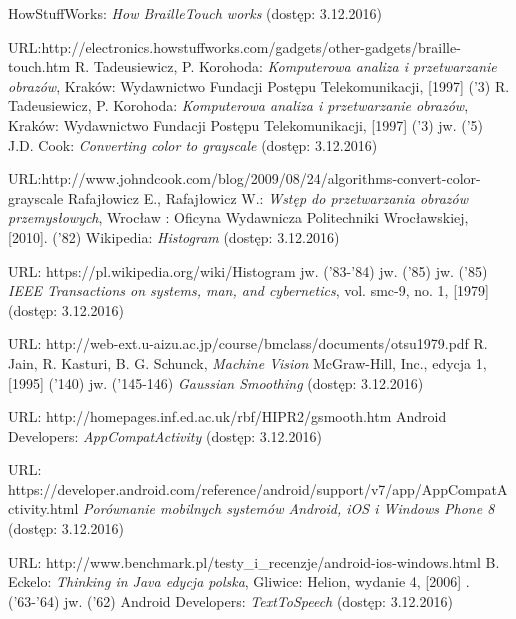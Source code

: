 \documentclass[eng,oneside]{mgr}
\begin{document}
\begin{thebibliography}{99}
 HowStuffWorks: \emph{How BrailleTouch works} (dostęp: 3.12.2016)
\par URL:\hspace{0.1cm}http://electronics.howstuffworks.com/gadgets/other-gadgets/braille-touch.htm
 R. Tadeusiewicz, P. Korohoda: \emph{Komputerowa analiza i przetwarzanie obrazów}, Kraków: Wydawnictwo Fundacji Postępu Telekomunikacji, [1997] ('3)
 R. Tadeusiewicz, P. Korohoda: \emph{Komputerowa analiza i przetwarzanie obrazów}, Kraków: Wydawnictwo Fundacji Postępu Telekomunikacji, [1997] ('3)
 jw. ('5)
 J.D. Cook: \emph{Converting color to grayscale} (dostęp: 3.12.2016) 
\par URL:\hspace{0.1cm}http://www.johndcook.com/blog/2009/08/24/algorithms-convert-color-grayscale
 Rafajłowicz E., Rafajłowicz W.: \emph {Wstęp do przetwarzania obrazów przemysłowych}, Wrocław : Oficyna Wydawnicza Politechniki Wrocławskiej, [2010]. ('82) 
 Wikipedia: \emph{Histogram} (dostęp: 3.12.2016) 
\par URL: https://pl.wikipedia.org/wiki/Histogram
 jw. ('83-'84)
 jw. ('85)
 jw. ('85)
 \emph{IEEE Transactions on systems, man, and cybernetics}, vol. smc-9, no. 1, [1979] (dostęp: 3.12.2016)
\par URL: http://web-ext.u-aizu.ac.jp/course/bmclass/documents/otsu1979.pdf
 R. Jain, R. Kasturi, B. G. Schunck, \emph{Machine Vision} McGraw-Hill, Inc., edycja 1, [1995] ('140)
 jw. ('145-146)
 \emph{Gaussian Smoothing} (dostęp: 3.12.2016) 
\par URL: http://homepages.inf.ed.ac.uk/rbf/HIPR2/gsmooth.htm
 Android Developers: \emph{AppCompatActivity} (dostęp: 3.12.2016)
\par URL: https://developer.android.com/reference/android/support/v7/app/AppCompatActivity.html
 \emph{Porównanie mobilnych systemów Android, iOS i Windows Phone 8} (dostęp: 3.12.2016) 
\par URL: http://www.benchmark.pl/testy\_i\_recenzje/android-ios-windows.html
 B. Eckelo: \emph{Thinking in Java edycja polska}, Gliwice: Helion, wydanie 4, [2006] .  ('63-'64)
 jw. ('62)
 Android Developers: \emph{TextToSpeech} (dostęp: 3.12.2016) 

\end{thebibliography}
\end{document}
